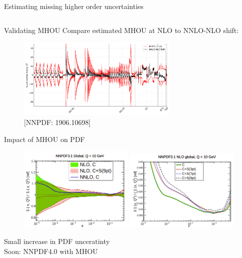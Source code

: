 \documentclass[aspectratio=169, 8pt,t]{beamer}
\begin{document}
\begin{frame}{Estimating missing higher order uncertainties}
\begin{columns}[T]
\begin{column}{0.49\textwidth}
    \end{column}
  \end{columns}
\end{frame}

\begin{frame}{Validating MHOU}
  Compare estimated MHOU at NLO to NNLO-NLO shift:
  \begin{figure}
    \includegraphics[width=0.69\textwidth]{figures/shift_diag_cov_comparison_7pt_global.pdf}
    \caption*{{\color{gray}\small [NNPDF: 1906.10698]}}
  \end{figure}
\end{frame}

\begin{frame}{Impact of MHOU on PDF}
  \begin{figure}
    \includegraphics[width=0.49\textwidth]{figures/nnpdf31mhousinglet.png}
    \includegraphics[width=0.49\textwidth]{figures/nnpdf31mhouuncs.png}
  \end{figure}
  Small increase in PDF unceratinty \\
  Soon: NNPDF4.0 with MHOU
\end{frame}
\end{document}
